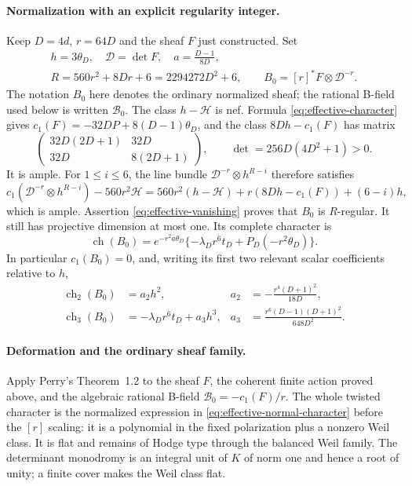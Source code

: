 \paragraph{Normalization with an explicit regularity integer.}
Keep $D=4d$, $r=64D$ and the sheaf $F$ just constructed. Set
\begin{equation}\label{eq:effective-normalization}
\begin{gathered}
 h=3\theta_D,\quad \mathcal D=\det F,\quad
 a=\frac{D-1}{8D},\\
 R=560r^2+8Dr+6=2294272D^2+6,\qquad
 B_0=[r]^*F\otimes\mathcal D^{-r}.
\end{gathered}                                             
\end{equation}
The notation $B_0$ here denotes the ordinary normalized sheaf;
the rational B-field used below is written $\mathcal B_0$.
The class $h-\mathcal H$ is nef. Formula \eqref{eq:effective-character} gives
$c_1(F)=-32DP+8(D-1)\theta_D$, and the class
$8Dh-c_1(F)$ has matrix
\[
 \begin{pmatrix}32D(2D+1)&32D\\32D&8(2D+1)\end{pmatrix},
 \qquad\det=256D(4D^2+1)>0.
\]
It is ample. For $1\le i\le6$, the line bundle
$\mathcal D^{-r}\otimes h^{R-i}$ therefore satisfies
\[
 c_1(\mathcal D^{-r}\otimes h^{R-i})-560r^2\mathcal H
 =560r^2(h-\mathcal H)+r(8Dh-c_1(F))+(6-i)h,
\]
which is ample. Assertion \eqref{eq:effective-vanishing} proves that $B_0$ is
$R$-regular. It still has projective dimension at most one.
Its complete character is
\begin{equation}\label{eq:effective-normal-character}
 \operatorname{ch}(B_0)=e^{-r^2a\theta_D}
       \{-\lambda_Dr^6t_D+P_D(-r^2\theta_D)\}.            
\end{equation}
In particular $c_1(B_0)=0$, and, writing its first two relevant
scalar coefficients relative to $h$,
\begin{equation}\label{eq:effective-a2a3}
 \begin{aligned}
 \operatorname{ch}_2(B_0)&=a_2h^2,
 &a_2&=-\frac{r^4(D+1)^2}{18D},\\
 \operatorname{ch}_3(B_0)&=-\lambda_Dr^6t_D+a_3h^3,
 &a_3&=\frac{r^6(D-1)(D+1)^2}{648D^2}.
 \end{aligned}                                             
\end{equation}

\paragraph{Deformation and the ordinary sheaf family.}
Apply Perry's Theorem~1.2 \cite{Perry} to the sheaf $F$, the
coherent finite action proved above, and the algebraic
rational B-field $\mathcal B_0=-c_1(F)/r$. The whole twisted
character is the normalized expression in \eqref{eq:effective-normal-character} before the
$[r]$ scaling: it is a polynomial in the fixed polarization
plus a nonzero Weil class. It is flat and remains of Hodge type
through the balanced Weil family. The determinant monodromy is an integral unit of $K$ of norm one and hence a root of unity; a finite cover makes the Weil class flat.

